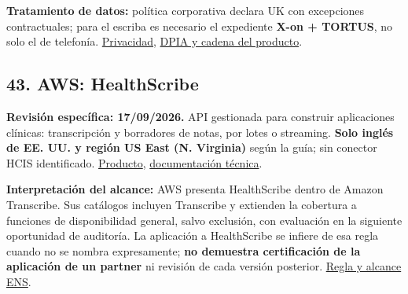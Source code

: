 \textbf{Tratamiento de datos:} política corporativa declara UK con excepciones contractuales; para el escriba es necesario el expediente \textbf{X-on + TORTUS}, no solo el de telefonía. \href{https://www.x-on.co.uk/privacy-notice/}{Privacidad}, \href{https://surgeryconnect.academy/trust-centre/}{DPIA y cadena del producto}.

\subsection*{43. AWS: HealthScribe}
\label{provider:43}

\textbf{Revisión específica: 17/\allowbreak{}09/\allowbreak{}2026.} API gestionada para construir aplicaciones clínicas: transcripción y borradores de notas, por lotes o streaming. \textbf{Solo inglés de EE. UU. y región US East (N. Virginia)} según la guía; sin conector HCIS identificado. \href{https://aws.amazon.com/es/healthscribe/}{Producto}, \href{https://docs.aws.amazon.com/transcribe/latest/dg/health-scribe.html}{documentación técnica}.

\textbf{Interpretación del alcance:} AWS presenta HealthScribe dentro de Amazon Transcribe. Sus catálogos incluyen Transcribe y extienden la cobertura a funciones de disponibilidad general, salvo exclusión, con evaluación en la siguiente oportunidad de auditoría. La aplicación a HealthScribe se infiere de esa regla cuando no se nombra expresamente; \textbf{no demuestra certificación de la aplicación de un partner} ni revisión de cada versión posterior. \href{https://aws.amazon.com/compliance/services-in-scope/ENS-High/}{Regla y alcance ENS}.

